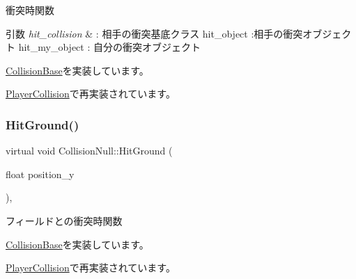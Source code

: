 衝突時関数 


\begin{DoxyParams}{引数}
{\em hit\+\_\+collision} & \+: 相手の衝突基底クラス hit\+\_\+object \+:相手の衝突オブジェクト hit\+\_\+my\+\_\+object \+: 自分の衝突オブジェクト \\
\hline
\end{DoxyParams}


\mbox{\hyperlink{class_collision_base_a5c94fe03f875595758e83eb2a176e45d}{Collision\+Base}}を実装しています。



\mbox{\hyperlink{class_player_collision_ad937a5fd226e742270202bf4eff53767}{Player\+Collision}}で再実装されています。

\mbox{\label{class_collision_null_a75900c2cec4e49336701e2e3c64e5bfe}} 
\subsubsection{\texorpdfstring{Hit\+Ground()}{HitGround()}}
{\footnotesize\ttfamily virtual void Collision\+Null\+::\+Hit\+Ground (\begin{DoxyParamCaption}\item[{float}]{position\+\_\+y }\end{DoxyParamCaption})\hspace{0.3cm}{\ttfamily [inline]}, {\ttfamily [virtual]}}



フィールドとの衝突時関数 



\mbox{\hyperlink{class_collision_base_a48c9d1d9e4286cde5054d4d2aa70bdd8}{Collision\+Base}}を実装しています。



\mbox{\hyperlink{class_player_collision_a3522ce17b1e1752f2737c2243582ecb0}{Player\+Collision}}で再実装されています。

\mbox{\label{class_collision_null_aba2a574ab42dca618c41dd0b9562f614}} 
